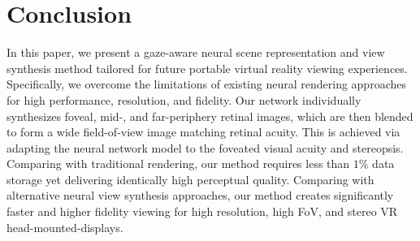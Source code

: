 \section{Conclusion}
\label{sec:conclusion}
In this paper, we present a gaze-aware neural scene representation and view synthesis method tailored for future portable virtual reality viewing experiences. Specifically, we overcome the limitations of existing neural rendering approaches for high performance, resolution, and fidelity. Our network individually synthesizes foveal, mid-, and far-periphery retinal images, which are then blended to form a wide field-of-view image matching retinal acuity. This is achieved via adapting the neural network model to the foveated visual acuity and stereopsis. 
Comparing with traditional rendering, our method requires less than $1\%$ data storage yet delivering identically high perceptual quality.
Comparing with alternative neural view synthesis approaches, our method creates significantly faster and higher fidelity viewing for high resolution, high FoV, and stereo VR head-mounted-displays.
 
